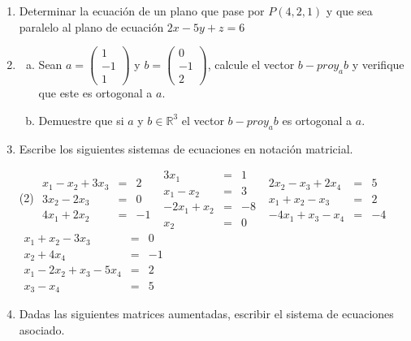 \documentclass[12pt]{article}
\newenvironment{preguntas}
{\begin{enumerate}\itemsep12pt
	}
	{
	\end{enumerate}
}
\newcommand{\R}{\mathbb{R}}
\begin{document}
\begin{preguntas}
\item Determinar la ecuación de un plano que pase por $P(4,2,1)$ y que sea paralelo al plano de ecuación $2x-5y+z=6$
\item 
\begin{enumerate}[a)]
\item Sean $a=\left(\begin{array}{r}
      1\\-1\\1
    \end{array}\right)$ y $b=\left(\begin{array}{r}
      0\\-1\\2
    \end{array}\right)$, calcule el vector\textbf{ $b-proy_a b$ }y verifique que este es ortogonal a $a$.
\item Demuestre que si $a$ y $b\in\R^3$ el vector $b-proy_a b$ es ortogonal a $a$.
\end{enumerate}
\item Escribe los siguientes sistemas de ecuaciones en notación matricial.
\begin{tasks}(2)
\task $
		\begin{array}{rcr}
		x_1 -x_2 + 3x_3 & = & 2\\
		3x_2 - 2x_3 & = & 0\\
		4x_1 +2x_2 & = & -1
		\end{array}
		$
\task $
		\begin{array}{rcr}
		3x_1 & = & 1\\
		x_1-x_2& = & 3\\
		-2x_1+x_2 & = & -8\\
		x_2 & = & 0
		\end{array}
		$
\task $
		\begin{array}{rcr}
		2x_2 -x_3 +2x_4& = & 5\\
		x_1+x_2 - x_3 & = & 2\\
		-4x_1 +x_3-x_4& = & -4
		\end{array}
		$
\task $
		\begin{array}{rcr}
		x_1 +x_2-3x_3& = & 0\\
		x_2+4x_4& = & -1\\
		x_1-2x_2+x_3-5x_4 & = & 2\\
		x_3-x_4 & = & 5
		\end{array}
		$
\end{tasks}
\item Dadas las siguientes matrices aumentadas, escribir el sistema de ecuaciones asociado.

\end{preguntas}
\end{document}
